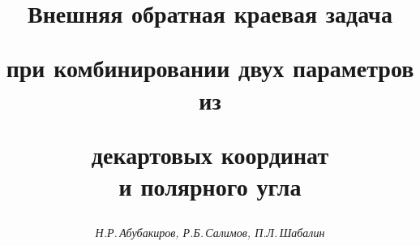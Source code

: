 




%


\newcommand{\ctg}{\operatorname{ctg}}


\newcommand{\re}{\operatorname{Re}}


\newcommand{\im}{\operatorname{Im}}


\newcommand{\tg}{\operatorname{tg}}


\renewcommand{\baselinestretch}{0.96}


\newcommand{\tts}[1]{}







\setcounter{page}{3}















\author{\it Н.Р.\,Абубакиров, Р.Б.\,Салимов, П.Л.\,Шабалин}




\title{Внешняя обратная краевая задача


при комбинировании двух параметров из


декартовых координат\\ и полярного угла}





\date{}




\pagestyle{plain} %







